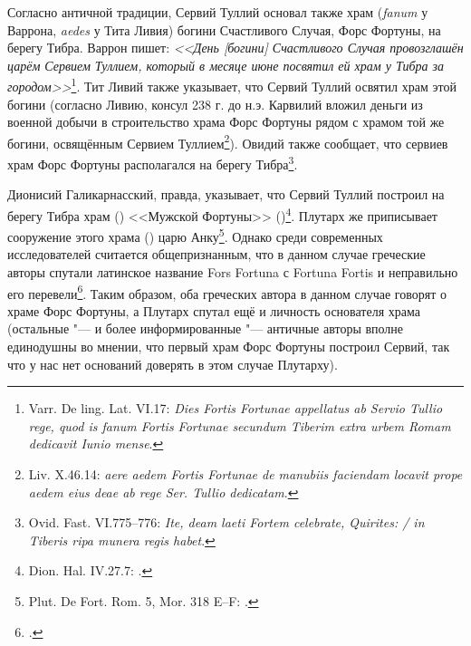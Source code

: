Согласно античной традиции, Сервий Туллий основал также храм (\textit{fanum} у Варрона, \textit{aedes} у Тита Ливия) богини Счастливого Случая, Форс Фортуны, на берегу Тибра. Варрон пишет: \textit{<<День [богини] Счастливого Случая провозглашён царём Сервием Туллием, который в месяце июне посвятил ей храм у Тибра за городом>>}\footnote{Varr. De ling. Lat. VI.17: \textit{Dies Fortis Fortunae appellatus ab Servio Tullio rege, quod is fanum Fortis Fortunae secundum Tiberim extra urbem Romam dedicavit Iunio mense}.}. Тит Ливий также указывает, что Сервий Туллий освятил храм этой богини (согласно Ливию, консул 238 г. до н.э. Карвилий вложил деньги из военной добычи в строительство храма Форс Фортуны рядом с храмом той же богини, освящённым Сервием Туллием\footnote{Liv. X.46.14: \textit{aere aedem Fortis Fortunae de manubiis faciendam locavit prope aedem eius deae ab rege Ser. Tullio dedicatam}.}). Овидий также сообщает, что сервиев храм Форс Фортуны располагался на берегу Тибра\footnote{Ovid. Fast. VI.775--776: \textit{Ite, deam laeti Fortem celebrate, Quirites: / in Tiberis ripa munera regis habet}.}.


Дионисий Галикарнасский, правда, указывает, что Сервий Туллий построил на берегу Тибра храм () <<Мужской Фортуны>> ()\footnote{Dion. Hal. IV.27.7: .}. Плутарх же приписывает сооружение этого храма () царю Анку\footnote{Plut. De Fort. Rom. 5, Mor. 318 E--F: .}. \label{LapsusGraecorum}Однако среди современных исследователей считается общепризнанным, что в данном случае греческие авторы спутали латинское название Fors Fortuna с Fortuna Fortis и неправильно его перевели\footcites[S. 479]{Becker1843I}[S. 180]{Preller1883}[Pp. 510--511]{Swain1989}. Таким образом, оба греческих автора в данном случае говорят о храме Форс Фортуны, а Плутарх спутал ещё и личность основателя храма (остальные "--- и более информированные "--- античные авторы вполне единодушны во мнении, что первый храм Форс Фортуны построил Сервий, так что у нас нет оснований доверять в этом случае Плутарху).


